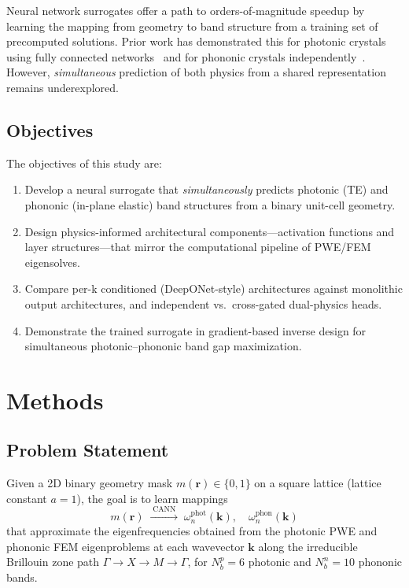 \documentclass[11pt]{article}
\begin{document}
Neural network surrogates offer a path to orders-of-magnitude speedup by learning the mapping from geometry to band structure from a training set of precomputed solutions. Prior work has demonstrated this for photonic crystals using fully connected networks~\cite{so2020} and for phononic crystals independently~\cite{liu2021mlphononic}. However, \emph{simultaneous} prediction of both physics from a shared representation remains underexplored.

\subsection{Objectives}

The objectives of this study are:
\begin{enumerate}
    \item Develop a neural surrogate that \emph{simultaneously} predicts photonic (TE) and phononic (in-plane elastic) band structures from a binary unit-cell geometry.
    \item Design physics-informed architectural components---activation functions and layer structures---that mirror the computational pipeline of PWE/FEM eigensolves.
    \item Compare per-k conditioned (DeepONet-style) architectures against monolithic output architectures, and independent vs.\ cross-gated dual-physics heads.
    \item Demonstrate the trained surrogate in gradient-based inverse design for simultaneous photonic--phononic band gap maximization.
\end{enumerate}

\section{Methods}
\label{sec:methods}

\subsection{Problem Statement}

Given a 2D binary geometry mask $m(\mathbf{r}) \in \{0, 1\}$ on a square lattice (lattice constant $a = 1$), the goal is to learn mappings
\begin{equation}
    m(\mathbf{r}) \;\xrightarrow{\;\text{CANN}\;}\; \omega^{\text{phot}}_n(\mathbf{k}), \quad \omega^{\text{phon}}_n(\mathbf{k})
\end{equation}
that approximate the eigenfrequencies obtained from the photonic PWE and phononic FEM eigenproblems at each wavevector $\mathbf{k}$ along the irreducible Brillouin zone path $\Gamma \to X \to M \to \Gamma$, for $N_b^p = 6$ photonic and $N_b^n = 10$ phononic bands.
\end{document}
